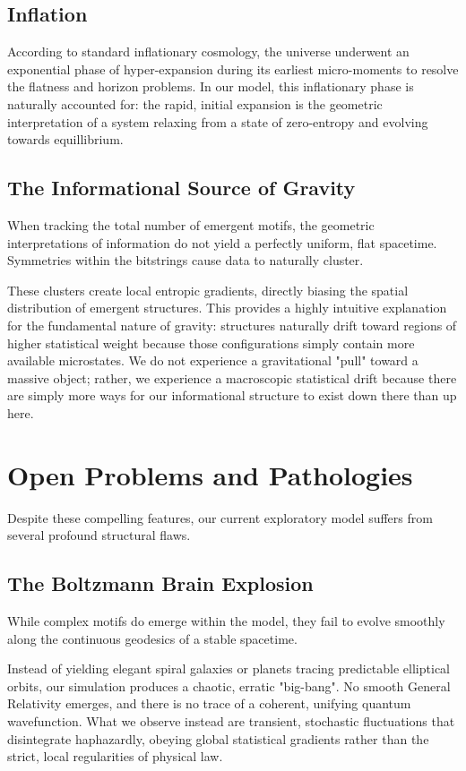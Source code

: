 \subsection*{Inflation}

According to standard inflationary cosmology, the universe underwent an exponential phase of hyper-expansion during its earliest micro-moments to resolve the flatness and horizon problems. In our model, this inflationary phase is naturally accounted for: the rapid, initial expansion is the geometric interpretation of a system relaxing from a state of zero-entropy and evolving towards equillibrium.

\subsection*{The Informational Source of Gravity}

When tracking the total number of emergent motifs, the geometric interpretations of information do not yield a perfectly uniform, flat spacetime. Symmetries within the bitstrings cause data to naturally cluster. 

These clusters create local entropic gradients, directly biasing the spatial distribution of emergent structures. This provides a highly intuitive explanation for the fundamental nature of gravity: structures naturally drift toward regions of higher statistical weight because those configurations simply contain more available microstates. We do not experience a gravitational "pull" toward a massive object; rather, we experience a macroscopic statistical drift because there are simply more ways for our informational structure to exist down there than up here.

\section{Open Problems and Pathologies}

Despite these compelling features, our current exploratory model suffers from several profound structural flaws.

\subsection*{The Boltzmann Brain Explosion}

While complex motifs do emerge within the model, they fail to evolve smoothly along the continuous geodesics of a stable spacetime.

Instead of yielding elegant spiral galaxies or planets tracing predictable elliptical orbits, our simulation produces a chaotic, erratic "big-bang". No smooth General Relativity emerges, and there is no trace of a coherent, unifying quantum wavefunction. What we observe instead are transient, stochastic fluctuations that disintegrate haphazardly, obeying global statistical gradients rather than the strict, local regularities of physical law. 

